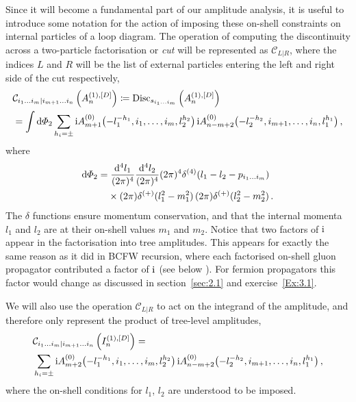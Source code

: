 Since it will become a fundamental part of our amplitude analysis, it is useful to introduce some
notation for the action of imposing these on-shell constraints on internal
particles of a loop diagram. The operation of computing the discontinuity
across a two-particle factorisation or \emph{cut} will be represented as $\mathcal{C}_{L|R}$, where
the indices $L$ and $R$ will be the list of external particles entering the left and right side of the cut respectively,
\begin{align}
  & \mathcal{C}_{i_1\ldots i_m|i_{m+1}\ldots i_n}\left( A_n^{(1),[D]} \right) \coloneqq {\rm Disc}_{s_{i_1\ldots i_m}}\left( A_n^{(1),[D]} \right)
     \nonumber\\
    &= \int \d\Phi_2 \sum_{h_i=\pm}
       \i A_{m+1}^{(0)}\bigl(-l_1^{-h_1}, i_1,\ldots,i_m, l_2^{h_2} \bigr)
    \, \i A_{n-m+2}^{(0)}\bigl(-l_2^{-h_2}, i_{m+1},\ldots,i_n, l_1^{h_1} \bigr) \,,
  \label{eq:Cnotationdef}
\end{align}
where
\begin{align} 
\label{eq:onshellPSmeasure}
\begin{aligned}
  \d\Phi_2 & =
  \frac{\d^4 l_1}{(2\pi)^4}
  \frac{\d^4 l_2}{(2\pi)^4}
     (2\pi)^4 \delta^{(4)}(l_1-l_2-p_{i_1\ldots i_m}) \\
     & \phantom{= {}} \times  (2\pi) \delta^{(+)}(l_1^2-m_1^2) \, (2\pi) \delta^{(+)}(l_2^2-m_2^2) \,.
\end{aligned}
\end{align}
The $\delta$ functions ensure momentum conservation, and that the internal
momenta $l_1$ and $l_2$ are at their on-shell values $m_1$ and $m_2$.
Notice that two factors of $\mathrm{i}$ appear in the factorisation into tree
amplitudes. This appears for exactly the same reason as it did in BCFW
recursion, where each factorised on-shell gluon propagator contributed a factor of
$\mathrm{i}$ (see below ). For fermion propagators this factor would change as discussed in section~\ref{sec:2.1} and exercise~\ref{Ex:3.1}.  

We will also use the operation $\mathcal{C}_{L|R}$ to act on the integrand of the amplitude,
and therefore only represent the product of tree-level amplitudes,
\begin{align}
\begin{aligned}
   &\mathcal{C}_{i_1\ldots i_m|i_{m+1}\ldots i_n}\left( I_n^{(1),[D]} \right)
    = \\
   & \sum_{h_i=\pm} \mathrm{i} A_{m+2}^{(0)} \bigl(-l_1^{-h_1}, i_1,\ldots,i_m, l_2^{h_2} \bigr) \, \mathrm{i} A_{n-m+2}^{(0)}\bigl(-l_2^{-h_2}, i_{m+1},\ldots,i_n, l_1^{h_1} \bigr) \,,
 \end{aligned}
  \label{eq:Cnotationdef}
\end{align}
where the on-shell conditions for $l_1$, $l_2$ are understood to be imposed.

